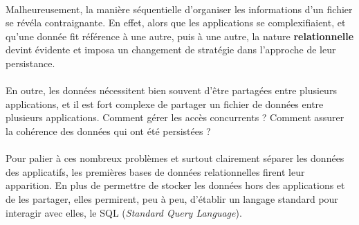 {  \paragraph{} Malheureusement, la manière séquentielle d'organiser les informations d'un fichier
  se révéla contraignante. En effet, alors que les applications se complexifiaient, et qu'une donnée
  fit référence à une autre, puis à une autre, la nature \textbf{relationnelle} devint évidente et
  imposa un changement de stratégie dans l'approche de leur persistance.

  \paragraph{} En outre, les données nécessitent bien souvent d'être partagées entre plusieurs
  applications, et il est fort complexe de partager un fichier de données entre plusieurs
  applications. Comment gérer les accès concurrents ? Comment assurer la cohérence des données qui
  ont été persistées ?
  \paragraph{} Pour palier à ces nombreux problèmes et surtout clairement séparer les données des
  applicatifs, les premières bases de données relationnelles firent leur apparition. En plus de
  permettre de stocker les données hors des applications et de les partager, elles permirent, peu à
  peu, d'établir un langage standard pour interagir avec elles, le SQL (\textit{Standard Query
  Language}).
}


